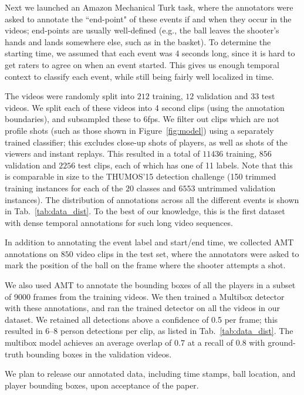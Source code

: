 Next we launched an Amazon Mechanical Turk task, where the
annotators were asked to annotate the ``end-point" of these events if and when
they occur in the videos; end-points are usually well-defined (e.g.,
the ball leaves the shooter's hands and lands somewhere else, such as
in the basket).
To determine the starting time, we assumed that each event was 4
seconds long, since it is hard to get raters to agree on when an event
started. 
This gives us enough temporal context to classify each event, while
still being fairly well localized in time.


The videos were randomly split into $212$ training, $12$ validation and $33$
test videos. 
We split each of these videos into 4 second clips (using the
annotation boundaries), and subsampled these to 6fps.
We filter out clips which are not profile shots (such as those shown in
Figure~\ref{fig:model}) using a separately trained classifier; this excludes close-up shots of players,  as
well as shots of the viewers and instant replays.
This resulted in a total of $11436$ training, $856$ validation
and $2256$ test clips, each of which has one of 11 labels.
Note that this is comparable in size to the THUMOS'15 detection
challenge (150 trimmed training instances for each of the $20$ classes and $6553$
untrimmed validation instances). The distribution of annotations across all the
different events is shown in Tab.~\ref{tab:data_dist}. To the best of our
knowledge, this is the first dataset with dense temporal annotations for such
long video sequences.


In addition to annotating the event label and start/end time, we collected AMT
annotations on $850$ video clips in the test set, where the annotators were
asked to mark the position of the ball on the frame where the shooter attempts
a shot.

We also used AMT to annotate the bounding boxes of all the players in a
subset of 9000 frames from the training videos.
We then trained a Multibox detector \cite{Szegedy_arxiv14}
with these annotations, and ran the trained detector on all the videos in our dataset.
We retained all detections above a confidence of 0.5 per frame;
this resulted in 6--8 person detections per clip, as listed in Tab.~\ref{tab:data_dist}.
The multibox model achieves an average overlap of $0.7$ at a recall of $0.8$
with ground-truth bounding boxes in the validation videos.

We plan to release our annotated data, including time stamps, ball
location, and player bounding boxes, upon acceptance of the paper.
